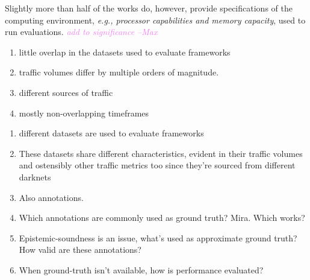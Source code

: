 \documentclass[manuscript,nonacm]{acmart}
\newcommand{\maxnote}[1]{\textit{\textcolor{violet}{#1 --Max}}}
\begin{document}
Slightly more than half of the works do, however, provide specifications of the computing environment, \textit{e.g., processor capabilities and memory capacity}, used to run evaluations.
\maxnote{add to significance}

\begin{enumerate}
    \item little overlap in the datasets used to evaluate frameworks
    \item traffic volumes differ by multiple orders of magnitude.
    \item different sources of traffic
    \item mostly non-overlapping timeframes
\end{enumerate}

\begin{enumerate}
	\item different datasets are used to evaluate frameworks
	\item These datasets share different characteristics, evident in their traffic volumes and ostensibly other traffic metrics too since they're sourced from different darknets
	\item Also annotations. 
	\item Which annotations are commonly used as ground truth? Mira. Which works?
	\item Epistemic-soundness is an issue, what's used as approximate ground truth? How valid are these annotations?
	\item When ground-truth isn't available, how is performance evaluated?
\end{enumerate}
\end{document}
